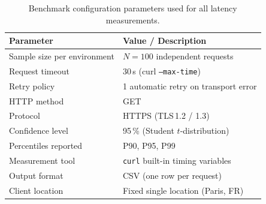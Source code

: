 \begin{table}[htbp]
  \centering
  \caption{Benchmark configuration parameters used for all latency measurements.}
  \label{tab:bench_params}
  \small
  \begin{tabular}{lp{8cm}}
    \toprule
    \textbf{Parameter} & \textbf{Value / Description} \\
    \midrule
    Sample size per environment & $N = 100$ independent requests \\
    Request timeout & 30\,s (curl \texttt{--max-time}) \\
    Retry policy & 1 automatic retry on transport error \\
    HTTP method & GET \\
    Protocol & HTTPS (TLS\,1.2 / 1.3) \\
    Confidence level & 95\,\% (Student $t$-distribution) \\
    Percentiles reported & P90, P95, P99 \\
    Measurement tool & \texttt{curl} built-in timing variables \\
    Output format & CSV (one row per request) \\
    Client location & Fixed single location (Paris, FR) \\
    \bottomrule
  \end{tabular}
\end{table}
